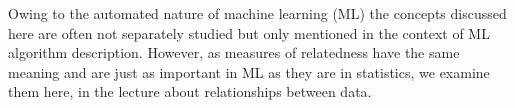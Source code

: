 



\setlength\parskip{1ex}

\graphicspath{ {../Common/images/} }

\graphicspath{ {images/} }

\pgclryellow
\title{}
\author{\vspace{3cm} Institute of Technology Tallaght}
\date{Department of Computing}
\maketitle
\newpage


Owing to the automated nature of machine learning (ML) the concepts discussed here are often not separately studied but only mentioned in the context of ML algorithm description. However, as measures of relatedness have the same meaning and are just as important in ML as they are in statistics, we examine them here, in the lecture about relationships between data.


